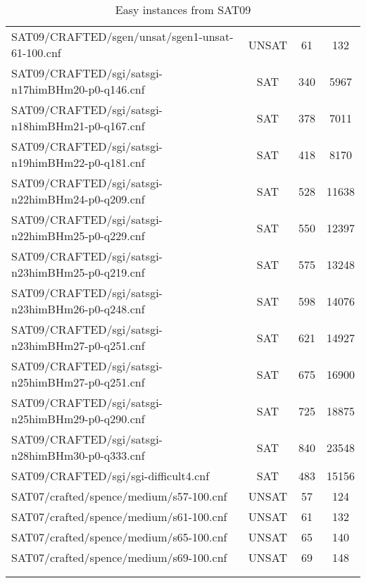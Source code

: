 {\begin{longtable}{| l | c c c |}
    SAT09/CRAFTED/sgen/unsat/sgen1-unsat-61-100.cnf & UNSAT & 61 & 132 \\
    SAT09/CRAFTED/sgi/satsgi-n17himBHm20-p0-q146.cnf & SAT & 340 & 5967 \\
    SAT09/CRAFTED/sgi/satsgi-n18himBHm21-p0-q167.cnf & SAT & 378 & 7011 \\
    SAT09/CRAFTED/sgi/satsgi-n19himBHm22-p0-q181.cnf & SAT & 418 & 8170 \\
    SAT09/CRAFTED/sgi/satsgi-n22himBHm24-p0-q209.cnf & SAT & 528 & 11638 \\
    SAT09/CRAFTED/sgi/satsgi-n22himBHm25-p0-q229.cnf & SAT & 550 & 12397 \\
    SAT09/CRAFTED/sgi/satsgi-n23himBHm25-p0-q219.cnf & SAT & 575 & 13248 \\
    SAT09/CRAFTED/sgi/satsgi-n23himBHm26-p0-q248.cnf & SAT & 598 & 14076 \\
    SAT09/CRAFTED/sgi/satsgi-n23himBHm27-p0-q251.cnf & SAT & 621 & 14927 \\
    SAT09/CRAFTED/sgi/satsgi-n25himBHm27-p0-q251.cnf & SAT & 675 & 16900 \\
    SAT09/CRAFTED/sgi/satsgi-n25himBHm29-p0-q290.cnf & SAT & 725 & 18875 \\
    SAT09/CRAFTED/sgi/satsgi-n28himBHm30-p0-q333.cnf & SAT & 840 & 23548 \\
    SAT09/CRAFTED/sgi/sgi-difficult4.cnf & SAT & 483 & 15156 \\
    SAT07/crafted/spence/medium/s57-100.cnf & UNSAT & 57 & 124 \\
    SAT07/crafted/spence/medium/s61-100.cnf & UNSAT & 61 & 132 \\
    SAT07/crafted/spence/medium/s65-100.cnf & UNSAT & 65 & 140 \\
    SAT07/crafted/spence/medium/s69-100.cnf & UNSAT & 69 & 148 \\
    \hline

    \caption{Easy instances from SAT09} \\
    \label{tbl:easy-instances}
  \end{longtable}
}
